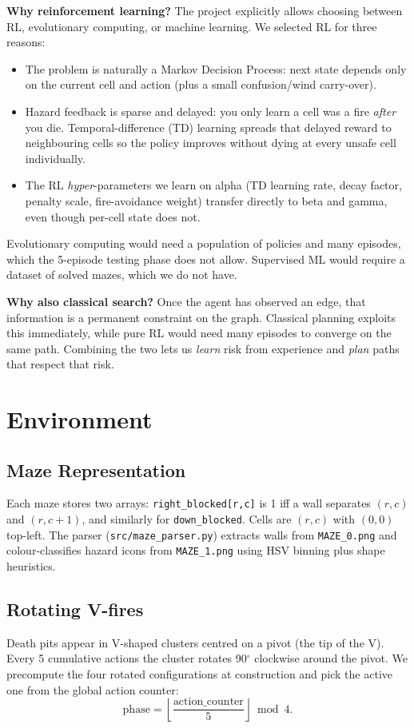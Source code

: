 \documentclass[11pt]{article}
\begin{document}
\textbf{Why reinforcement learning?}  The project explicitly allows
choosing between RL, evolutionary computing, or machine learning.  We
selected RL for three reasons:
\begin{itemize}[itemsep=0.2em]
  \item The problem is naturally a Markov Decision Process: next state
    depends only on the current cell and action (plus a small
    confusion/wind carry-over).
  \item Hazard feedback is sparse and delayed: you only learn a cell
    was a fire \emph{after} you die.  Temporal-difference (TD) learning
    spreads that delayed reward to neighbouring cells so the policy
    improves without dying at every unsafe cell individually.
  \item The RL \emph{hyper}-parameters we learn on alpha (TD learning
    rate, decay factor, penalty scale, fire-avoidance weight) transfer
    directly to beta and gamma, even though per-cell state does not.
\end{itemize}
Evolutionary computing would need a population of policies and many
episodes, which the 5-episode testing phase does not allow.  Supervised
ML would require a dataset of solved mazes, which we do not have.

\textbf{Why also classical search?}  Once the agent has observed an edge,
that information is a permanent constraint on the graph.  Classical
planning exploits this immediately, while pure RL would need many
episodes to converge on the same path.  Combining the two lets us
\emph{learn} risk from experience and \emph{plan} paths that respect
that risk.

\section{Environment}

\subsection{Maze Representation}
Each maze stores two arrays:
\texttt{right\_blocked[r,c]} is 1 iff a wall separates $(r,c)$ and
$(r, c{+}1)$, and similarly for \texttt{down\_blocked}.  Cells are
$(r,c)$ with $(0,0)$ top-left.  The parser
(\texttt{src/maze\_parser.py}) extracts walls from \texttt{MAZE\_0.png}
and colour-classifies hazard icons from \texttt{MAZE\_1.png} using
HSV binning plus shape heuristics.

\subsection{Rotating V-fires}
Death pits appear in V-shaped clusters centred on a pivot (the tip of
the V).  Every 5 cumulative actions the cluster rotates 90$^{\circ}$
clockwise around the pivot.  We precompute the four rotated
configurations at construction and pick the active one from the global
action counter:
\[
\mathrm{phase} = \left\lfloor \frac{\text{action\_counter}}{5} \right\rfloor \bmod 4.
\]
\end{document}
